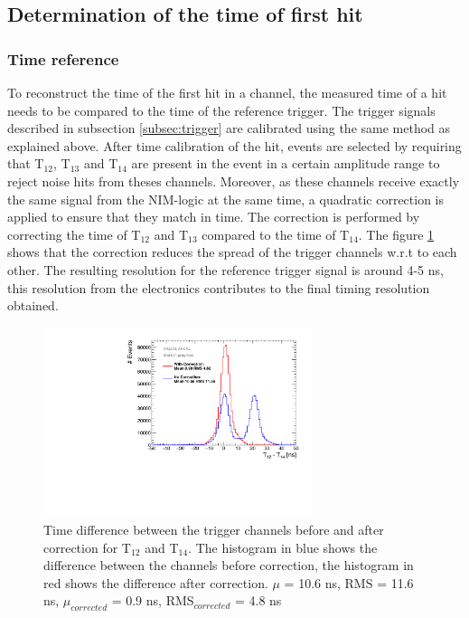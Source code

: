 \documentclass[twoside,a4paper,11pt]{article}
\begin{document}
\subsection{Determination of the time of first hit}

\subsubsection{Time reference}
To reconstruct the time of the first hit in a channel, the measured time of a hit needs to be compared to the time of the reference trigger. The trigger signals described in subsection \ref{subsec:trigger} are calibrated using the same method as explained above. After time calibration of the hit, events are selected by requiring that T$_{12}$, T$_{13}$ and T$_{14}$ are present in the event in a certain amplitude range to reject noise hits from theses channels. Moreover, as these channels receive exactly the same signal from the NIM-logic at the same time, a quadratic correction is applied to ensure that they match in time. The correction is performed by correcting the time of T$_{12}$ and T$_{13}$ compared to the time of T$_{14}$. The figure \ref{fig:T0_Correction} shows that the correction reduces the spread of the trigger channels w.r.t to each other. The resulting resolution for the reference trigger signal is around 4-5 ns, this resolution from the electronics contributes to the final timing resolution obtained.
\begin{figure}[htbp]
\begin{center}
\includegraphics[width=0.7\textwidth]{fig/T0s/T0_Resolution_5.pdf}
\caption{Time difference between the trigger channels before and after correction for T$_{12}$ and T$_{14}$. The histogram in blue shows the difference between the channels before correction, the histogram in red shows the difference after correction. $\mu$ = 10.6 ns, RMS = 11.6 ns, $\mu_{corrected}$ = 0.9 ns, RMS$_{corrected}$ = 4.8 ns}
\label{fig:T0_Correction}
\end{center}
\end{figure}
\end{document}
